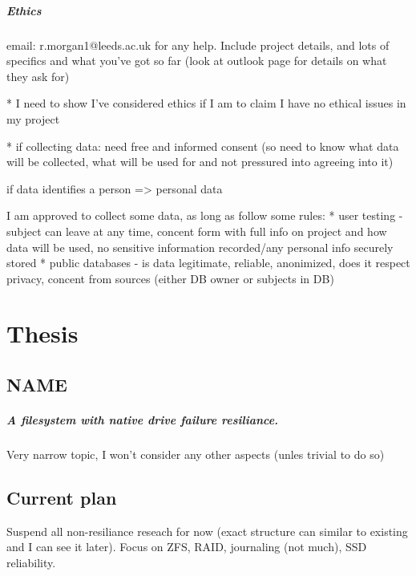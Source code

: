 \documentclass[a4paper]{report}
\begin{document}
        \paragraph{Ethics}
        email: r.morgan1@leeds.ac.uk for any help. Include project details, and
        lots of specifics and what you've got so far (look at outlook page for
        details on what they ask for)

        * I need to show I've considered ethics if I am to claim I have no
          ethical issues in my project

        * if collecting data: need free and informed consent (so need to know
          what data will be collected, what will be used for and not pressured
          into agreeing into it)

          if data identifies a person => personal data

          I am approved to collect some data, as long as follow some rules:
          * user testing - subject can leave at any time, concent form with full
            info on project and how data will be used, no sensitive information
            recorded/any personal info securely stored
          * public databases - is data legitimate, reliable, anonimized, does
            it respect privacy, concent from sources (either DB owner or subjects
            in DB)


\chapter{Thesis}
    \section{NAME}
        \paragraph{A filesystem with native drive failure resiliance.}
        Very narrow topic, I won't consider any other aspects (unles trivial to
        do so)

    \section{Current plan}
        Suspend all non-resiliance reseach for now (exact structure can similar
        to existing and I can see it later). Focus on ZFS, RAID, journaling
        (not much), SSD reliability.
\end{document}
